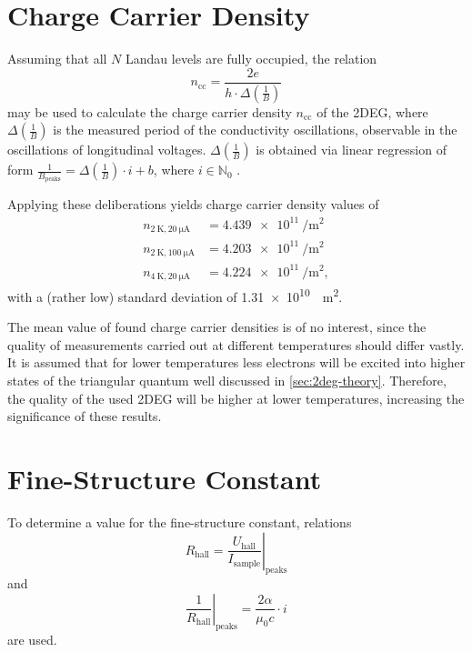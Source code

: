 \section{Charge Carrier Density} %
Assuming that all $N$ Landau levels are fully occupied, the relation
\begin{equation*}
	n_\text{cc} = \frac{2e}{h\cdot\Delta\left(\frac{1}{B}\right)}
\end{equation*}
may be used to calculate the charge carrier density $n_\text{cc}$ of the 2DEG, where $\Delta\left(\frac{1}{B}\right)$ is the measured period of the conductivity oscillations, observable in the oscillations of longitudinal voltages.
$\Delta\left(\frac{1}{B}\right)$ is obtained via linear regression of form $\frac{1}{B_\text{peaks}} = \Delta\left(\frac{1}{B}\right)\cdot i + b$, where $i\in\mathbb{N}_0$ .

Applying these deliberations yields charge carrier density values of
\begin{align*}
	n_{\SI{2}{\kelvin},\SI{20}{\micro\ampere}} &= \SI{4.439e11}{\per\meter\squared} \\
	n_{\SI{2}{\kelvin},\SI{100}{\micro\ampere}} &= \SI{4.203e11}{\per\meter\squared} \\
	n_{\SI{4}{\kelvin},\SI{20}{\micro\ampere}} &= \SI{4.224e11}{\per\meter\squared},
\end{align*}
with a (rather low) standard deviation of \SI{1.31e10}{\per\meter\squared}.

The mean value of found charge carrier densities is of no interest, since the quality of measurements carried out at different temperatures should differ vastly.
It is assumed that for lower temperatures less electrons will be excited into higher states of the triangular quantum well discussed in \autoref{sec:2deg-theory}.
Therefore, the quality of the used 2DEG will be higher at lower temperatures, increasing the significance of these results.

\section{Fine-Structure Constant} %
To determine a value for the fine-structure constant, relations
\begin{equation*}
	R_\text{hall} = \left. \frac{U_\text{hall}}{I_\text{sample}}\right\rvert_\text{peaks}
\end{equation*}
and
\begin{equation*}
	\left. \frac{1}{R_\text{hall}}\right\rvert_\text{peaks} = \frac{2\alpha}{\mu_0 c}\cdot i
\end{equation*}
are used.

